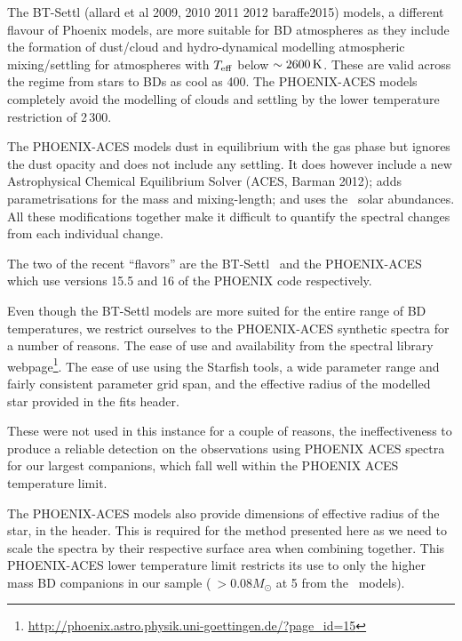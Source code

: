 \label{bt-setll}
The {BT-Settl} (allard et al 2009, 2010 2011 2012 baraffe2015) models, a different flavour of Phoenix models, are more suitable for {BD} atmospheres as they include the formation of dust/cloud and hydro-dynamical modelling atmospheric mixing/settling for atmospheres with \(T_{\mathrm{eff}}{}\) below \(\sim2600\,\si{\kelvin}{}\). These are valid across the regime from stars to BDs as cool as 400\K{}. The {PHOENIX-ACES} models completely avoid the modelling of clouds and settling by the lower temperature restriction of 2\,300\K{}.

The {PHOENIX-ACES} models dust in equilibrium with the gas phase but ignores the dust opacity and does not include any settling. It does however include a new Astrophysical Chemical Equilibrium Solver (ACES,
Barman 2012); adds parametrisations for the mass and mixing-length; and uses the~\citet{asplund_chemical_2009} solar abundances. All these modifications together make it difficult to quantify the spectral changes from each individual change.

The two of the recent ``flavors'' are the {BT-Settl}~\citep{allard_model_2010, baraffe_new_2015} and the {PHOENIX-ACES}~\citep{husser_new_2013} which use versions 15.5 and 16 of the PHOENIX code respectively.

Even though the {BT-Settl} models are more suited for the entire range of {BD} temperatures, we restrict ourselves to the {PHOENIX-ACES} synthetic spectra for a number of reasons. The ease of use and availability from the spectral library webpage\footnote{\url{http://phoenix.astro.physik.uni-goettingen.de/?page_id=15}}. The ease of use using the Starfish tools, a wide parameter range and fairly consistent parameter grid span, and the effective radius of the modelled star provided in the fits header.

These were not used in this instance for a couple of reasons, the ineffectiveness to produce a reliable detection on the observations using PHOENIX ACES spectra for our largest companions, which fall well within the PHOENIX ACES temperature limit.

The {PHOENIX-ACES} models also provide dimensions of effective radius of the star, in the header. This is required for the method presented here as we need to scale the spectra by their respective surface area when combining together.
This {PHOENIX-ACES} lower temperature limit restricts its use to only the higher mass {BD} companions in our sample (\(~>0.08 M_{\odot}\) at 5\Gyr{} from the~\citet{baraffe_evolutionary_2003} models).


